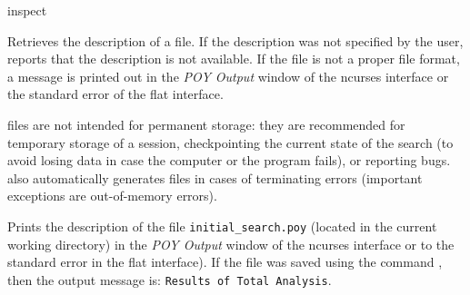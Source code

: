 \begin{command}{inspect}{}

	\syntax{\obligatory{(\poystring)}} 

	\begin{poydescription}
        Retrieves the description of a \poy file. If the description was
        not specified by the user,  reports that the
        description is not available. If the file is not a proper
        \poy file format, a message is printed out in the \emph{POY Output}
        window of the ncurses interface or the standard error of the flat interface.

        \poy files are not intended for permanent storage: they are recommended
        for temporary storage of a \poy session, checkpointing
        the current state of the search (to avoid losing data in case the computer or the
        program fails), or reporting bugs. \poy also automatically
        generates \poy files in cases of terminating errors (important exceptions are
        out-of-memory errors). 

    \end{poydescription}

    \begin{poyexamples}
            {Prints the description of the \poy file \texttt{initial\_search.poy}
            (located in the current working directory) in the \emph{POY Output}
            window of the ncurses interface or to the standard error in the flat
            interface). If the file was saved using
            the command , then the output message is: \texttt{Results of
            Total Analysis}.}
    \end{poyexamples}

    \begin{poyalso}
    \end{poyalso}

\end{command}

